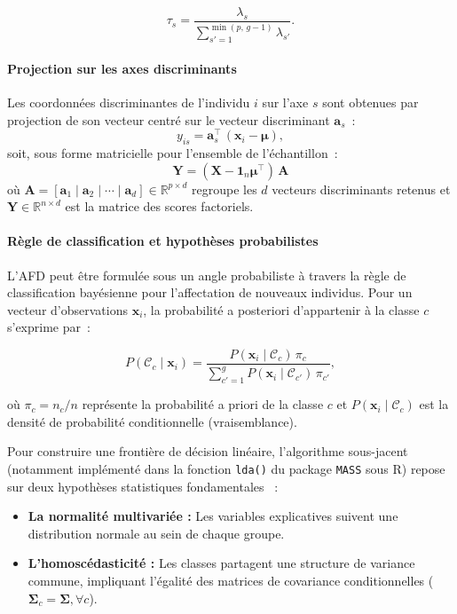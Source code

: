 \documentclass[12pt, a4paper, oneside]{report}
\begin{document}
	\begin{equation}
		\tau_s = \frac{\lambda_s}{\displaystyle\sum_{s'=1}^{\min(p,\,g-1)} \lambda_{s'}}.
		\label{eq:inertie_afd}
	\end{equation}
	
	\paragraph{Projection sur les axes discriminants}
	Les coordonnées discriminantes de l'individu $i$ sur l'axe $s$ sont obtenues par projection de son vecteur centré sur le vecteur discriminant $\mathbf{a}_s$~:
	\begin{equation}
		y_{is} = \mathbf{a}_s^{\top}\,(\mathbf{x}_i - \boldsymbol{\mu}),
		\label{eq:projection}
	\end{equation}
	soit, sous forme matricielle pour l'ensemble de l'échantillon~:
	\begin{equation}
		\boxed{\mathbf{Y} = (\mathbf{X} - \mathbf{1}_n\boldsymbol{\mu}^{\top})\,\mathbf{A}}
		\label{eq:proj_matrice}
	\end{equation}
	où $\mathbf{A} = [\mathbf{a}_1 \mid \mathbf{a}_2 \mid \cdots \mid \mathbf{a}_d] \in \mathbb{R}^{p \times d}$ regroupe les $d$ vecteurs discriminants retenus et $\mathbf{Y} \in \mathbb{R}^{n \times d}$ est la matrice des scores factoriels.
	
	\paragraph{Règle de classification et hypothèses probabilistes}
	L'AFD peut être formulée sous un angle probabiliste à travers la règle de classification bayésienne pour l'affectation de nouveaux individus. Pour un vecteur d'observations $\mathbf{x}_i$, la probabilité a posteriori d'appartenir à la classe $c$ s'exprime par~:
	
	\begin{equation}
		P(\mathcal{C}_c \mid \mathbf{x}_i) = \frac{P(\mathbf{x}_i \mid \mathcal{C}_c)\,\pi_c}{\displaystyle\sum_{c'=1}^{g} P(\mathbf{x}_i \mid \mathcal{C}_{c'})\,\pi_{c'}},
		\label{eq:bayes}
	\end{equation}
	
	où $\pi_c = n_c / n$ représente la probabilité a priori de la classe $c$ et $P(\mathbf{x}_i \mid \mathcal{C}_c)$ est la densité de probabilité conditionnelle (vraisemblance). 
	
	Pour construire une frontière de décision linéaire, l'algorithme sous-jacent (notamment implémenté dans la fonction \texttt{lda()} du package \texttt{MASS} sous R) repose sur deux hypothèses statistiques fondamentales \cite[chap.~12]{venables2002modern}~:
	\begin{itemize}
		\item \textbf{La normalité multivariée :} Les variables explicatives suivent une distribution normale au sein de chaque groupe.
		\item \textbf{L'homoscédasticité :} Les classes partagent une structure de variance commune, impliquant l'égalité des matrices de covariance conditionnelles ($\boldsymbol{\Sigma}_c = \boldsymbol{\Sigma}, \forall c$).
	\end{itemize}
	
\end{document}

